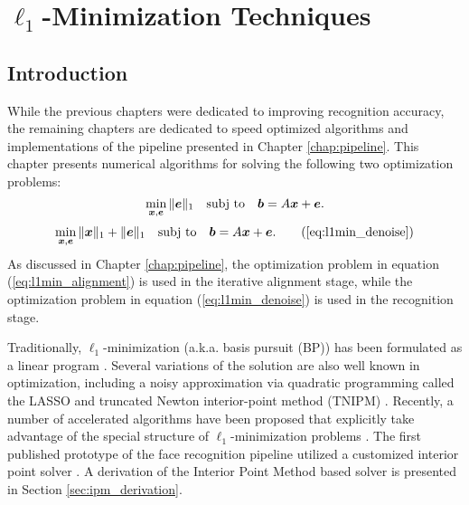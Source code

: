 \chapter{$\ell_1$-Minimization Techniques}
\label{chap:minimization}

\section{Introduction}
While the previous chapters were dedicated to improving recognition accuracy,
the remaining chapters are dedicated to speed optimized
algorithms and implementations of the pipeline presented in Chapter
\ref{chap:pipeline}.  This chapter presents numerical algorithms for solving the following
two optimization problems:
\begin{equation}
\min_{{\boldsymbol{x}}, {\boldsymbol{e}}} \|{\boldsymbol{e}}\|_1 \quad \textup{subj to} \quad \boldsymbol{b} = A {\boldsymbol{x}} + {\boldsymbol{e}}.
\label{eq:l1min_alignment}
\end{equation}
\begin{equation}
\min_{\xx, \ee} \| \xx \|_1 + \|\ee\|_1 \quad \subj \quad \bb = A \xx + \ee.
\tag{\ref{eq:l1min_denoise}}
\end{equation}
As discussed in Chapter \ref{chap:pipeline}, the optimization problem in equation
(\ref{eq:l1min_alignment}) is used in the iterative alignment stage, while the optimization
problem in equation (\ref{eq:l1min_denoise}) is used in the recognition stage.

Traditionally, $\ell_1$-minimization (a.k.a.
basis pursuit (BP)) has been formulated as a linear program
\cite{ChenS2001-SIAM}. 
Several variations of the solution are also well known
in optimization, including a noisy approximation via quadratic programming
called the LASSO \cite{TibshiraniR1996} and truncated Newton interior-point
method (TNIPM) \cite{KimS2007}.
Recently, a number of accelerated algorithms have been proposed that
explicitly take advantage of the special structure of $\ell_1$-minimization
problems \cite{LorisI2009,YangA2010-pp}. 
The first published prototype of the face recognition pipeline utilized a customized
interior point solver \cite{WagnerA2009-CVPR}.  A derivation of the Interior Point
Method based solver is presented in Section \ref{sec:ipm_derivation}.

